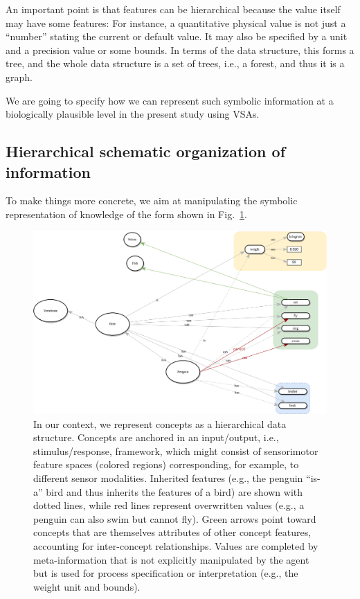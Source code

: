 \documentclass[sn-mathphys]{sn-jnl}
\begin{document}
An important point is that features can be hierarchical because the value itself may have some features: For instance, a quantitative physical value is not just a ``number'' stating the current or default value. It may also be specified by a unit and a precision value or some bounds. In terms of the data structure, this forms a tree, and the whole data structure is a set of trees, i.e., a forest, and thus it is a graph.

We are going to specify how we can represent such symbolic information at a biologically plausible level in the present study using VSAs.

\subsection{Hierarchical schematic organization of information} \label{hierarchical}

To make things more concrete, we aim at manipulating the symbolic representation of knowledge of the form shown in Fig.~\ref{concept-grounding}.

\begin{figure}[htbp]
\centerline{\includegraphics[width=\textwidth]{./concept-grounding.png}}
\caption{In our context, we represent concepts as a hierarchical data structure. Concepts are anchored in an input/output, i.e., stimulus/response, framework, which might consist of sensorimotor feature spaces (colored regions) corresponding, for example, to different sensor modalities. Inherited features (e.g., the penguin “is-a” bird and thus inherits the features of a bird) are shown with dotted lines, while red lines represent overwritten values (e.g., a penguin can also swim but cannot fly). Green arrows point toward concepts that are themselves attributes of other concept features, accounting for inter-concept relationships.
Values are completed by meta-information that is not explicitly manipulated by the agent but is used for process specification or interpretation (e.g., the weight unit and bounds).}\label{concept-grounding}
\end{figure}
\end{document}
